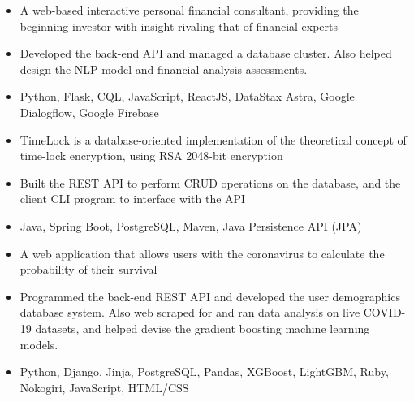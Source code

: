 \documentclass[11pt,letterpaper]{article}
\begin{document}
    \begin{itemize}
      \item{A web-based interactive personal financial consultant, providing the beginning investor with insight rivaling that of financial experts}
      \item{Developed the back-end API and managed a database cluster. Also helped design the NLP model and financial analysis assessments.}
      \item{
        {}
        Python, Flask, CQL, JavaScript, ReactJS, DataStax Astra, Google Dialogflow, Google Firebase
      }
    \end{itemize}
  \fi

  \iftimelock
    {\fontsize{12}{12}}

    \begin{itemize}
      \item{TimeLock is a database-oriented implementation of the theoretical concept of time-lock encryption, using RSA 2048-bit encryption}

      \item{Built the REST API to perform CRUD operations on the database, and the client CLI program to interface with the API}

      \item{
        {}
        Java, Spring Boot, PostgreSQL, Maven, Java Persistence API (JPA)
      }
    \end{itemize}
  \fi

  \ifcovidsurvivalcalculator
    {\fontsize{12}{12}}

    \begin{itemize}
      \item{A web application that allows users with the coronavirus to calculate the probability of their survival}

      \item{Programmed the back-end REST API and developed the user demographics database system. Also web scraped for and ran data analysis on live COVID-19 datasets, and helped devise the gradient boosting machine learning models.}

      \item{
        {}
        Python, Django, Jinja, PostgreSQL, Pandas, XGBoost, LightGBM, Ruby, Nokogiri, JavaScript, HTML/CSS
      }
    \end{itemize}
  \fi
\end{document}
